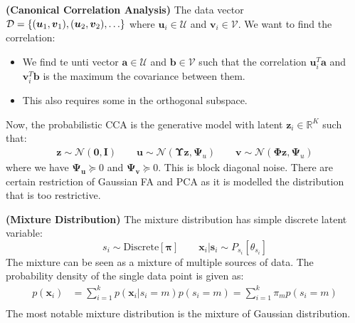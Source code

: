 \begin{definition}{\textbf{(Canonical Correlation Analysis)}}
    The data vector $\mathcal{D}=\brackc{(\boldsymbol u_1, \boldsymbol v_1), (\boldsymbol u_2,\boldsymbol v_2),\dots}$ where $\boldsymbol u_i \in \mathcal{U}$ and $\boldsymbol v_i \in \mathcal{V}$. We want to find the correlation:
    \begin{itemize}
        \item We find te unti vector $\boldsymbol a\in\mathcal{U}$ and $\boldsymbol b\in\mathcal{V}$ such that the correlation $\boldsymbol u_i^T\boldsymbol a$ and $\boldsymbol v_i^T\boldsymbol b$ is the maximum the covariance between them.
        \item This also requires some in the orthogonal subspace. 
    \end{itemize}
    Now, the probabilistic CCA is the generative model with latent $\boldsymbol z_i \in \mathbb{R}^K$ such that:
    \begin{equation*}
    \begin{aligned}
        \boldsymbol z \sim \mathcal{N}(\boldsymbol 0, \boldsymbol I) \qquad \boldsymbol u \sim \mathcal{N}(\boldsymbol \Upsilon\boldsymbol z, \boldsymbol \Psi_u) \qquad \boldsymbol v \sim \mathcal{N}(\boldsymbol \Phi\boldsymbol z, \boldsymbol \Psi_u)
    \end{aligned}
    \end{equation*}
    where we have $\boldsymbol\Psi_{\boldsymbol u}\succeq0$ and $\boldsymbol\Psi_{\boldsymbol v}\succeq0$. This is block diagonal noise. There are certain restriction of Gaussian FA and PCA as it is modelled the distribution that is too restrictive. 
\end{definition}

\begin{definition}{\textbf{(Mixture Distribution)}}
    The mixture distribution has simple discrete latent variable:
    \begin{equation*}
        s_i \sim \text{Discrete}[\boldsymbol \pi] \qquad \boldsymbol x_i | \boldsymbol s_i \sim P_{s_i}[\theta_{s_i}]
    \end{equation*}
    The mixture can be seen as a mixture of multiple sources of data. The probability density of the single data point is given as:
    \begin{equation*}
    \begin{aligned}
        p(\boldsymbol x_i) &= \sum^k_{i=1} p(\boldsymbol x_i | s_i=m)p(s_i=m) = \sum^k_{i=1} \pi_m p(s_i=m) \\
    \end{aligned}
    \end{equation*}
    The most notable mixture distribution is the mixture of Gaussian distribution. 
\end{definition}

